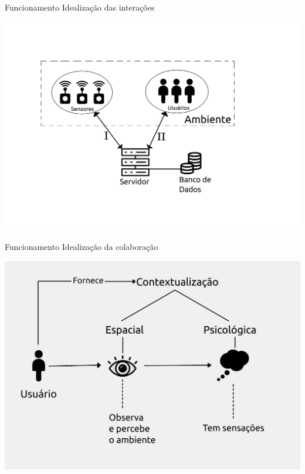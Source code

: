 \documentclass{beamer}
\begin{document}
  \begin{frame}{Funcionamento}
    \quad Idealização das interações
    \begin{center}
    \includegraphics[scale=0.7]{solucao1}
    \end{center}
  \end{frame}
  \begin{frame}{Funcionamento}
    \quad Idealização da colaboração
    \begin{center}
    \includegraphics[scale=0.7]{solucao2}
    \end{center}
  \end{frame}
\end{document}
